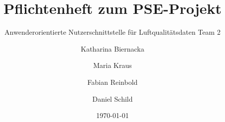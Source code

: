\title{Pflichtenheft zum PSE-Projekt}
\subtitle{Anwenderorientierte Nutzerschnittstelle für Luftqualitätsdaten Team 2}
\date{\today}
\author{Katharina Biernacka \and Maria Kraus \and Fabian Reinbold \and Daniel Schild}
\newcommand{\softwarename}{VisAQ }
\newcommand{\longSoftwarename}{Visualizing air quality}